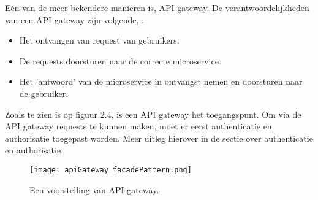 Eén van de meer bekendere manieren is, API gateway. De verantwoordelijkheden van een API gateway zijn volgende, \textcite{Siraj2017}:
\begin{itemize}
	\item Het ontvangen van request van gebruikers.
	\item De requests doorsturen naar de correcte microservice.
	\item Het 'antwoord' van de microservice in ontvangst nemen en doorsturen naar de gebruiker.
\end{itemize}
Zoals te zien is op figuur 2.4, is een API gateway het toegangspunt. Om via de API gateway requests te kunnen maken, moet er eerst authenticatie en authorisatie toegepast worden. Meer uitleg hierover in de sectie over authenticatie en authorisatie.
\begin{figure}[h]
	\texttt{[image: apiGateway\_facadePattern.png]}
	\centering
	\caption{Een voorstelling van API gateway. \textcite{Siraj2017}}
\end{figure}


